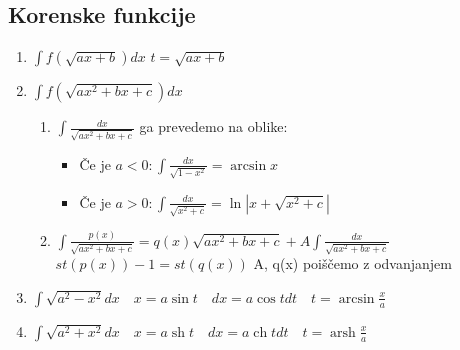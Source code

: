 \documentclass[a4paper,oneside,8pt]{extarticle}
\theoremstyle{definition}
\DeclareMathOperator\ch{ch}
\DeclareMathOperator\sh{sh}
\DeclareMathOperator\arsh{arsh}
\newcommand\abs[1]{\left|#1\right|}
\begin{document}
\begin{multicols}{2}
	\subsection*{Korenske funkcije}
	\begin{enumerate}
		\item $\int f(\sqrt{ax + b})dx$ \qquad $t = \sqrt{ax + b}$\\
		\item $\int f(\sqrt{ax^2 + bx + c})dx$\\
		\begin{enumerate}[a]
			\item $\int \frac{dx}{\sqrt{ax^2 + bx + c}}$ ga prevedemo na oblike:
			\begin{itemize}
				\item Če je $a < 0: \int \frac{dx}{\sqrt{1-x^2}} = \arcsin{x}$
				\item Če je $a > 0: \int \frac{dx}{\sqrt{x^2 + c}} = \ln{\abs{x + \sqrt{x^2 + c}}}$
			\end{itemize}
			\item $\int \frac{p(x)}{\sqrt{ax^2 + bx + c}} = q(x)\sqrt{ax^2 + bx + c} + A\int\frac{dx}{\sqrt{ax^2 + bx + c}}$\\
			$st(p(x)) - 1 = st(q(x))$ \quad A, q(x) poiščemo z odvanjanjem
		\end{enumerate}
		\item $\int \sqrt{a^2 - x^2}dx \quad x = a\sin{t} \quad dx = a\cos{t}dt \quad t = \arcsin{\frac{x}{a}}$
		\item $\int \sqrt{a^2 + x^2}dx \quad x = a\sh{t} \quad dx=a\ch{t}dt \quad t = \arsh{\frac{x}{a}}$ 
	\end{enumerate}
%

\end{multicols}
\end{document}

